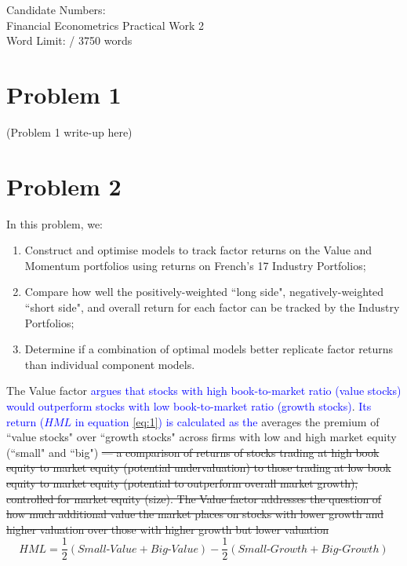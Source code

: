 \documentclass[AER]{AEA}
\begin{document}
\pagestyle{empty}
\vspace*{\fill}
\begin{spacing}{2}
\begin{center}
Candidate Numbers:  \\

Financial Econometrics Practical Work 2 \\

Word Limit: / 3750 words
\end{center}
\vspace*{\fill}
\newpage

\pagestyle{fancy}

\setcounter{page}{1}

\fancyhf{} %
\renewcommand{\headrulewidth}{0pt} %

\section{Problem 1}

(Problem 1 write-up here)

\section{Problem 2}

In this problem, we:
\begin{enumerate}
    \item Construct and optimise models to track factor returns on the Value and Momentum portfolios using returns on French's 17 Industry Portfolios;
    \item Compare how well the positively-weighted ``long side", negatively-weighted ``short side", and overall return for each factor can be tracked by the Industry Portfolios;
    \item Determine if a combination of optimal models better replicate factor returns than individual component models.
\end{enumerate} 

The Value factor \textcolor{blue}{argues that stocks with high book-to-market ratio (value stocks) would outperform stocks with low book-to-market ratio (growth stocks)}. \textcolor{blue}{Its return ($HML$ in equation \ref{eq:1}) is calculated as the }averages the premium of ``value stocks" over ``growth stocks" across firms with low and high market equity (``small" and ``big")\sout{ — a comparison of returns of stocks trading at high book equity to market equity (potential undervaluation) to those trading at low book equity to market equity (potential to outperform overall market growth), controlled for market equity (size). The Value factor addresses the question of how much additional value the market places on stocks with lower growth and higher valuation over those with higher growth but lower valuation}  
\begin{equation}
    HML=\frac{1}{2}(Small\text{-}Value+Big\text{-}Value)-\frac{1}{2}(Small\text{-}Growth+Big\text{-}Growth)\label{eq:1}
\end{equation}


\end{spacing}
\end{document}
